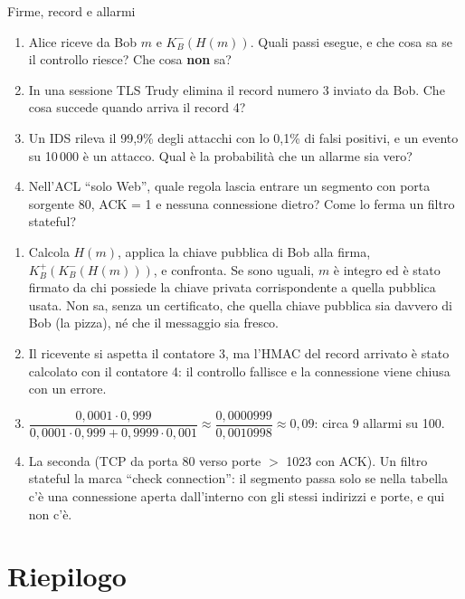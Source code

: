 \begin{esercizio}{Firme, record e allarmi}
\begin{enumerate}[label=(\alph*)]
    \item Alice riceve da Bob $m$ e $K_B^-(H(m))$. Quali passi esegue, e che cosa sa se il controllo riesce? Che cosa \textbf{non} sa?
    \item In una sessione TLS Trudy elimina il record numero 3 inviato da Bob. Che cosa succede quando arriva il record 4?
    \item Un IDS rileva il 99,9\% degli attacchi con lo 0,1\% di falsi positivi, e un evento su 10\,000 è un attacco. Qual è la
          probabilità che un allarme sia vero?
    \item Nell'ACL ``solo Web'', quale regola lascia entrare un segmento con porta sorgente 80, ACK = 1 e nessuna connessione dietro? Come lo
          ferma un filtro stateful?
\end{enumerate}

\svolgimento
\begin{enumerate}[label=(\alph*)]
    \item Calcola $H(m)$, applica la chiave pubblica di Bob alla firma, $K_B^+(K_B^-(H(m)))$, e confronta. Se sono uguali, $m$ è integro ed è
          stato firmato da chi possiede la chiave privata corrispondente a quella pubblica usata. Non sa, senza un certificato, che quella
          chiave pubblica sia davvero di Bob (la pizza), né che il messaggio sia fresco.
    \item Il ricevente si aspetta il contatore 3, ma l'HMAC del record arrivato è stato calcolato con il contatore 4: il controllo fallisce e
          la connessione viene chiusa con un errore.
    \item $\dfrac{0{,}0001 \cdot 0{,}999}{0{,}0001 \cdot 0{,}999 + 0{,}9999 \cdot 0{,}001} \approx \dfrac{0{,}0000999}{0{,}0010998}
          \approx 0{,}09$: circa 9 allarmi su 100.
    \item La seconda (TCP da porta 80 verso porte $>$ 1023 con ACK). Un filtro stateful la marca ``check connection'': il segmento passa solo
          se nella tabella c'è una connessione aperta dall'interno con gli stessi indirizzi e porte, e qui non c'è.
\end{enumerate}
\end{esercizio}

\section{Riepilogo}

